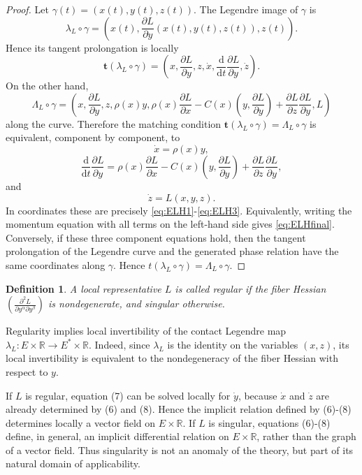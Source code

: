 \documentclass[11pt]{article}
\newtheorem{definition}[theorem]{Definition}
\newcommand{\dd}{\mathrm{d}}
\begin{document}
\begin{proof}
Let \(\gamma(t)=(x(t),y(t),z(t))\). The Legendre image of \(\gamma\) is
\[
        \lambda_L\circ\gamma
        =
        \left(
        x(t),
        \frac{\partial L}{\partial y}(x(t),y(t),z(t)),
        z(t)
        \right).
\]
Hence its tangent prolongation is locally
\[
        \mathbf t(\lambda_L\circ\gamma)
        =
        \left(
        x,
        \frac{\partial L}{\partial y},
        z,
        \dot x,
        \frac{\dd}{\dd t}\frac{\partial L}{\partial y},
        \dot z
        \right).
\]
On the other hand,
\[
\Lambda_L\circ\gamma
=
\left(
 x,\frac{\partial L}{\partial y},z,
 \rho(x)y,
 \rho(x)\frac{\partial L}{\partial x}
 -
 C(x)\left(y,\frac{\partial L}{\partial y}\right)
 +
 \frac{\partial L}{\partial z}
 \frac{\partial L}{\partial y},
 L
\right)
\]
along the curve. Therefore the matching condition
$\mathbf t(\lambda_L\circ\gamma)
        =
        \Lambda_L\circ\gamma$ is equivalent, component by component, to
\[
        \dot x=\rho(x)y,
\]
\[
        \frac{\dd}{\dd t}
        \frac{\partial L}{\partial y}
        =
        \rho(x)\frac{\partial L}{\partial x}
        -
        C(x)\left(y,\frac{\partial L}{\partial y}\right)
        +
        \frac{\partial L}{\partial z}
        \frac{\partial L}{\partial y},
\]
and
\[
        \dot z=L(x,y,z).
\]
In coordinates these are precisely \eqref{eq:ELH1}-\eqref{eq:ELH3}.
Equivalently, writing the momentum equation with all terms on the left-hand side
gives \eqref{eq:ELHfinal}. Conversely, if these three component equations hold, then the tangent
prolongation of the Legendre curve and the generated phase relation have
the same coordinates along \(\gamma\). Hence
\(t(\lambda_L\circ\gamma)=\Lambda_L\circ\gamma\).
\end{proof}


\begin{definition}
A local representative \(L\) is called \emph{regular} if the fiber Hessian $\left(\frac{\partial^2L}{\partial y^\alpha\partial y^\beta}\right)$ is nondegenerate, and \emph{singular} otherwise.
\end{definition}




Regularity implies local invertibility of the contact Legendre map $\lambda_L:E\times\mathbb R\rightarrow E^*\times\mathbb R$. Indeed, since \(\lambda_L\) is the identity on the variables \((x,z)\), its local
invertibility is equivalent to the nondegeneracy of the fiber Hessian with respect
to \(y\).

If \(L\) is regular, equation (7) can be solved locally for \(\dot y\), because
\(\dot x\) and \(\dot z\) are already determined by (6) and (8). Hence the
implicit relation defined by (6)-(8) determines locally a vector field on
\(E\times\mathbb R\). If \(L\) is singular, equations (6)-(8) define, in general, an implicit
differential relation on \(E\times\mathbb R\), rather than the graph of a vector
field. Thus singularity is not an anomaly of the theory, but part of its natural
domain of applicability.
\end{document}
